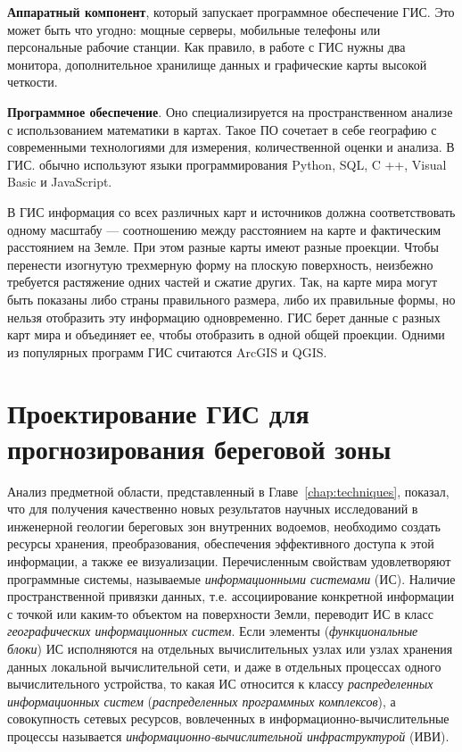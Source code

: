 \documentclass[732,14pt,final]{studrep}
\begin{document}
\textbf{Аппаратный компонент}, который запускает программное обеспечение ГИС. Это может быть что угодно: мощные серверы, мобильные телефоны или персональные рабочие станции. Как правило, в работе с ГИС нужны два монитора, дополнительное хранилище данных и графические карты высокой четкости.

\textbf{Программное обеспечение}. Оно специализируется на пространственном анализе с использованием математики в картах. Такое ПО сочетает в себе географию с современными технологиями для измерения, количественной оценки и анализа. В ГИС. обычно используют языки программирования Python, SQL, C ++, Visual Basic и JavaScript.

В ГИС информация со всех различных карт и источников должна соответствовать одному масштабу — соотношению между расстоянием на карте и фактическим расстоянием на Земле. При этом разные карты имеют разные проекции. Чтобы перенести изогнутую трехмерную форму на плоскую поверхность, неизбежно требуется растяжение одних частей и сжатие других. Так, на карте мира могут быть показаны либо страны правильного размера, либо их правильные формы, но нельзя отобразить эту информацию одновременно. ГИС берет данные с разных карт мира и объединяет ее, чтобы отобразить в одной общей проекции. Одними из популярных программ ГИС считаются ArcGIS и QGIS.

\chapter{Проектирование ГИС для прогнозирования береговой зоны}\label{chap:proj}

Анализ предметной области, представленный в Главе~\ref{chap:techniques}, показал, что для получения качественно новых результатов научных исследований в инженерной геологии береговых зон внутренних водоемов, необходимо создать ресурсы хранения, преобразования, обеспечения эффективного доступа к этой информации, а также ее визуализации. Перечисленным свойствам удовлетворяют программные системы, называемые \emph{информационными системами} (ИС). Наличие пространственной привязки данных, т.е. ассоциирование конкретной информации с точкой или каким-то объектом на поверхности Земли, переводит ИС в класс \emph{географических информационных систем}. Если элементы (\emph{функциональные блоки}) ИС исполняются на отдельных вычислительных узлах или узлах хранения данных локальной вычислительной сети, и даже в отдельных процессах одного вычислительного устройства, то какая ИС относится к классу \emph{распределенных информационных систем} (\emph{распределенных программных комплексов}), а совокупность сетевых ресурсов, вовлеченных в информационно-вычислительные процессы называется \emph{информационно-вычислительной инфраструктурой} (ИВИ).
\end{document}
